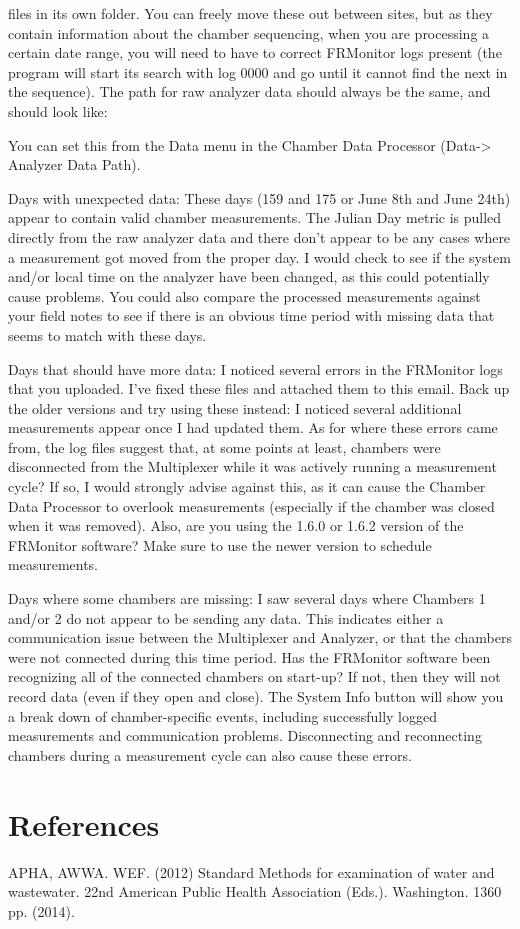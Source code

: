\documentclass[12pt]{../SOP3}\usepackage[]{graphicx}\usepackage[]{color}
\begin{document}
files in its own folder. You can freely move these out between sites, but as they contain information about the chamber sequencing, when you are processing a certain date range, you will need to have to correct FRMonitor logs present (the program will start its search with log 0000 and go until it cannot find the next in the sequence). 
The path for raw analyzer data should always be the same, and should look like:  

You can set this from the Data menu in the Chamber Data Processor (Data-> Analyzer Data Path).

Days with unexpected data:  These days (159 and 175 or June 8th and June 24th) appear to contain valid chamber measurements. The Julian Day metric is pulled directly from the raw analyzer data and there don't appear to be any cases where a measurement got moved from the proper day. I would check to see if the system and/or local time on the analyzer have been changed, as this could potentially cause problems. You could also compare the processed measurements against your field notes to see if there is an obvious time period with missing data that seems to match with these days.

Days that should have more data: I noticed several errors in the FRMonitor logs that you uploaded. I've fixed these files and attached them to this email. Back up the older versions and try using these instead: I noticed several additional measurements appear once I had updated them. As for where these errors came from, the log files suggest that, at some points at least, chambers were disconnected from the Multiplexer while it was actively running a measurement cycle? If so, I would strongly advise against this, as it can cause the Chamber Data Processor to overlook measurements (especially if the chamber was closed when it was removed). Also, are you using the 1.6.0 or 1.6.2 version of the FRMonitor software? Make sure to use the newer version to schedule measurements.


Days where some chambers are missing: I saw several days where Chambers 1 and/or 2 do not appear to be sending any data. This indicates either a communication issue between the Multiplexer and Analyzer, or that the chambers were not connected during this time period. Has the FRMonitor software been recognizing all of the connected chambers on start-up?  If not, then they will not record data (even if they open and close). The System Info button will show you a break down of chamber-specific events, including successfully logged measurements and communication problems. Disconnecting and reconnecting chambers during a measurement cycle can also cause these errors.




\section{References}



\NP APHA, AWWA. WEF. (2012) Standard Methods for examination of water and wastewater. 22nd American Public Health Association (Eds.). Washington. 1360 pp. (2014).
\end{document}
